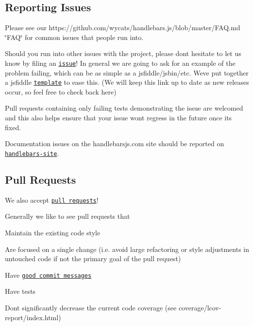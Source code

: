 \subsection*{Reporting Issues}

Please see our https\+://github.com/wycats/handlebars.\+js/blob/master/\+F\+AQ.md \char`\"{}\+F\+A\+Q\char`\"{} for common issues that people run into.

Should you run into other issues with the project, please don\textquotesingle{}t hesitate to let us know by filing an \href{https://github.com/wycats/handlebars.js/issues/new}{\tt issue}! In general we are going to ask for an example of the problem failing, which can be as simple as a jsfiddle/jsbin/etc. We\textquotesingle{}ve put together a jsfiddle \href{https://jsfiddle.net/9D88g/47/}{\tt template} to ease this. (We will keep this link up to date as new releases occur, so feel free to check back here)

Pull requests containing only failing tests demonstrating the issue are welcomed and this also helps ensure that your issue won\textquotesingle{}t regress in the future once it\textquotesingle{}s fixed.

Documentation issues on the handlebarsjs.\+com site should be reported on \href{https://github.com/wycats/handlebars-site}{\tt handlebars-\/site}.

\subsection*{Pull Requests}

We also accept \href{https://github.com/wycats/handlebars.js/pull/new/master}{\tt pull requests}!

Generally we like to see pull requests that
\begin{DoxyItemize}
\item Maintain the existing code style
\item Are focused on a single change (i.\+e. avoid large refactoring or style adjustments in untouched code if not the primary goal of the pull request)
\item Have \href{http://tbaggery.com/2008/04/19/a-note-about-git-commit-messages.html}{\tt good commit messages}
\item Have tests
\item Don\textquotesingle{}t significantly decrease the current code coverage (see coverage/lcov-\/report/index.\+html)
\end{DoxyItemize}

